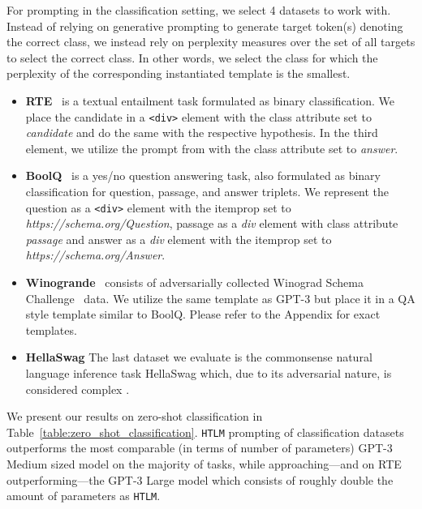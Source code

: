 \documentclass[11pt,a4paper]{article}
\newcommand{\HTLM}{\texttt{HTLM}}
\begin{document}
For prompting in the classification setting, we select 4 datasets to work with. Instead of relying on generative prompting to generate target token(s) denoting the correct class, we instead rely on perplexity measures over the set of all targets to select the correct class. In other words, we select the class for which the perplexity of the corresponding instantiated template is the  smallest.


\begin{itemize}[label={},leftmargin=0pt]
\item \textbf{RTE}~\citep{rte} is a textual entailment task formulated as binary classification. We place the candidate in a \verb+<div>+ element with the class attribute set to \textit{candidate} and do the same with the respective hypothesis. In the third element, we utilize the prompt from \citet{gpt3} with the class attribute set to \textit{answer}.

\item \textbf{BoolQ}~\citep{clark2019boolq} is a yes/no question answering task, also formulated as binary classification for question, passage, and answer triplets. We represent the question as a \verb+<div>+ element with the itemprop set to \textit{https://schema.org/Question}, passage as a \emph{div} element with class attribute \textit{passage} and answer as a \emph{div} element with the itemprop set to \textit{https://schema.org/Answer}.

\item \textbf{Winogrande}~\citep{winograd} consists of adversarially collected Winograd Schema Challenge~\cite{levesque2011winograd} data. We utilize the same template as GPT-3 but place it in a QA style template similar to BoolQ. Please refer to the Appendix for exact templates.

\item \textbf{HellaSwag}
The last dataset we evaluate is the commonsense natural language inference task HellaSwag which, due to its adversarial nature, is considered complex \citep{hellaswag}. 
\end{itemize}

We present our results on zero-shot classification in Table~\ref{table:zero_shot_classification}. \HTLM{} prompting of classification datasets outperforms the most comparable (in terms of number of parameters) GPT-3 Medium sized model on the majority of tasks, while approaching---and on RTE outperforming---the GPT-3 Large model which consists of roughly double the amount of parameters as \HTLM{}.
\end{document}
